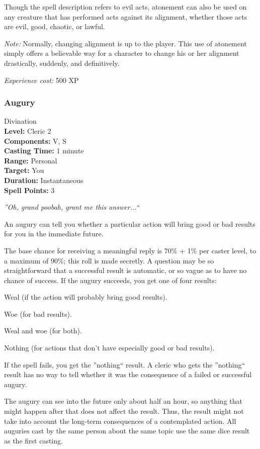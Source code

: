Though the spell description refers to evil acts, 
atonement can also be used on any creature that has performed acts against its alignment, whether those acts are evil, good, chaotic, or lawful.

\emph{Note:} Normally, changing alignment is up to the player. 
This use of atonement simply offers a believable way for a character to change his or her alignment drastically, suddenly, and definitively.
 
\emph{Experience cost:} 500 XP
\subsubsection{Augury}
\label{Spell:Augury}
Divination
\\ \textbf{Level:} Cleric 2
\\ \textbf{Components:} V, S
\\ \textbf{Casting Time:} 1 minute
\\ \textbf{Range:} Personal
\\ \textbf{Target:} You
\\ \textbf{Duration:} Instantaneous
\\ \textbf{Spell Points:} 3

\emph{''Oh, grand poobah, grant me this answer...``}

An augury can tell you whether a particular action will bring good or bad results for you in the immediate future.

The base chance for receiving a meaningful reply is 70\% + 1\% per caster level, to a maximum of 90\%; this roll is made secretly. 
A question may be so straightforward that a successful result is automatic, or so vague as to have no chance of success. 
If the augury succeeds, you get one of four results:

\begin{list}{}{\leftmargin=1em}
 \item Weal (if the action will probably bring good results).
 \item Woe (for bad results).
 \item Weal and woe (for both).
 \item Nothing (for actions that don't have especially good or bad results).
\end{list}
If the spell fails, you get the ''nothing`` result. A cleric who gets the ''nothing`` result has no way to tell whether it was the consequence of a failed or successful augury.

The augury can see into the future only about half an hour, so anything that might happen after that does not affect the result. 
Thus, the result might not take into account the long-term consequences of a contemplated action. 
All auguries cast by the same person about the same topic use the same dice result as the first casting.

